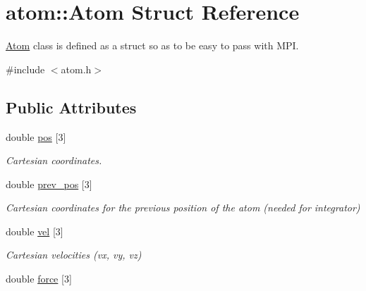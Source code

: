 \hypertarget{structatom_1_1Atom}{\section{atom\-:\-:Atom Struct Reference}
\label{structatom_1_1Atom}
}


\hyperlink{structatom_1_1Atom}{Atom} class is defined as a struct so as to be easy to pass with M\-P\-I.  




{\ttfamily \#include $<$atom.\-h$>$}

\subsection*{Public Attributes}
\begin{DoxyCompactItemize}
\item 
\hypertarget{structatom_1_1Atom_a7acbde98e9818512724c2551894ba8e0}{double \hyperlink{structatom_1_1Atom_a7acbde98e9818512724c2551894ba8e0}{pos} \mbox{[}3\mbox{]}}\label{structatom_1_1Atom_a7acbde98e9818512724c2551894ba8e0}

\begin{DoxyCompactList}\small\item\em Cartesian coordinates. \end{DoxyCompactList}\item 
\hypertarget{structatom_1_1Atom_a500f35c4575248f9079244236b8b4d3f}{double \hyperlink{structatom_1_1Atom_a500f35c4575248f9079244236b8b4d3f}{prev\-\_\-pos} \mbox{[}3\mbox{]}}\label{structatom_1_1Atom_a500f35c4575248f9079244236b8b4d3f}

\begin{DoxyCompactList}\small\item\em Cartesian coordinates for the previous position of the atom (needed for integrator) \end{DoxyCompactList}\item 
\hypertarget{structatom_1_1Atom_a76876313225c6fd231435e41e30047d3}{double \hyperlink{structatom_1_1Atom_a76876313225c6fd231435e41e30047d3}{vel} \mbox{[}3\mbox{]}}\label{structatom_1_1Atom_a76876313225c6fd231435e41e30047d3}

\begin{DoxyCompactList}\small\item\em Cartesian velocities (vx, vy, vz) \end{DoxyCompactList}\item 
\hypertarget{structatom_1_1Atom_a019685c7e932fd17a4779eaa35f190b2}{double \hyperlink{structatom_1_1Atom_a019685c7e932fd17a4779eaa35f190b2}{force} \mbox{[}3\mbox{]}}\label{structatom_1_1Atom_a019685c7e932fd17a4779eaa35f190b2}


\end{DoxyCompactItemize}
